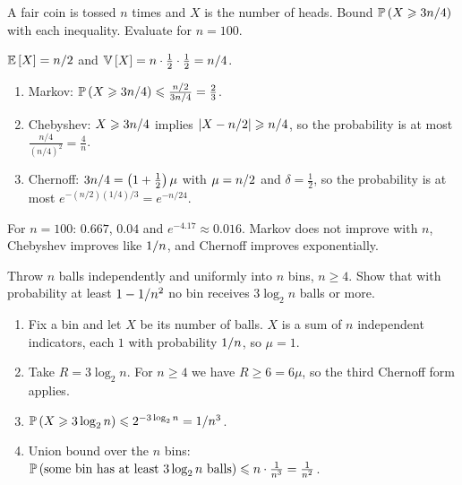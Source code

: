 \begin{exercisebox}
\begin{pproblem}\label{pp:three}
    A fair coin is tossed $n$ times and $X$ is the number of heads. Bound
    $\operatorname{\mathbb{P}}\left(X \geqslant 3n/4\right)$ with each inequality. Evaluate for $n = 100$.
\end{pproblem}
\tcblower
\begin{wsolution}
    $\operatorname{\mathbb{E}}\left[X\right] = n/2$ and $\operatorname{\mathbb{V}}\left[X\right] = n \cdot \frac{1}{2} \cdot \frac{1}{2} = n/4$.
    \begin{enumerate}
        \item Markov: $\operatorname{\mathbb{P}}\left(X \geqslant 3n/4\right) \leqslant \frac{n/2}{3n/4} = \frac{2}{3}$.
        \item Chebyshev: $X \geqslant 3n/4$ implies $\left\lvert X - n/2\right\rvert \geqslant n/4$, so
              the probability is at most $\frac{n/4}{(n/4)^2} = \frac{4}{n}$.
        \item Chernoff: $3n/4 = \left(1 + \frac{1}{2}\right)\mu$ with $\mu = n/2$ and
              $\delta = \frac{1}{2}$, so the probability is at most
              $e^{-(n/2)(1/4)/3} = e^{-n/24}$.
    \end{enumerate}
    For $n = 100$: $0.667$, $0.04$ and $e^{-4.17} \approx 0.016$. Markov does not improve with $n$,
    Chebyshev improves like $1/n$, and Chernoff improves exponentially.
\end{wsolution}
\end{exercisebox}

\begin{exercisebox}
\begin{pproblem}\label{pp:balls}
    Throw $n$ balls independently and uniformly into $n$ bins, $n \geq 4$. Show that with probability
    at least $1 - 1/n^2$ no bin receives $3 \log_2 n$ balls or more.
\end{pproblem}
\tcblower
\begin{wsolution}
    \leavevmode
    \begin{enumerate}
        \item Fix a bin and let $X$ be its number of balls. $X$ is a sum of $n$ independent
              indicators, each $1$ with probability $1/n$, so $\mu = 1$.
        \item Take $R = 3 \log_2 n$. For $n \geq 4$ we have $R \geq 6 = 6\mu$, so the third Chernoff
              form applies.
        \item $\operatorname{\mathbb{P}}\left(X \geqslant 3 \log_2 n\right) \leqslant 2^{-3 \log_2 n} = 1/n^3$.
        \item Union bound over the $n$ bins:
              $\operatorname{\mathbb{P}}\left(\text{some bin has at least } 3 \log_2 n \text{ balls}\right) \leqslant n \cdot \frac{1}{n^3} = \frac{1}{n^2}$. \qedhere
    \end{enumerate}
\end{wsolution}
\end{exercisebox}

